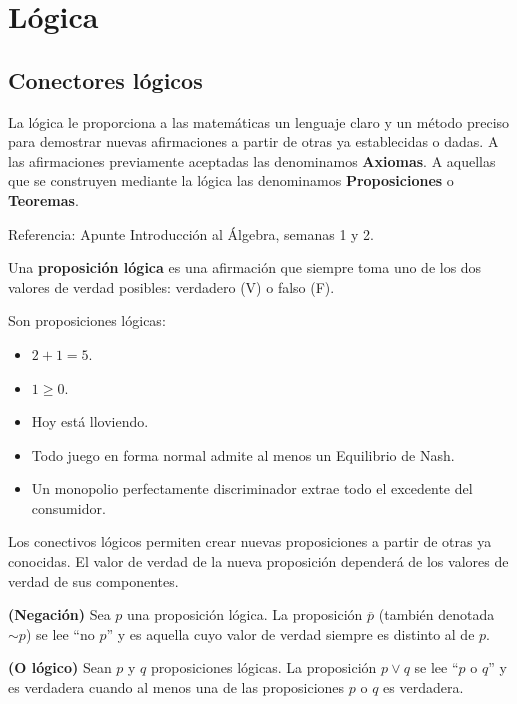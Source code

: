 
\section{Lógica}

\subsection{Conectores lógicos}

La lógica le proporciona a las matemáticas un lenguaje claro y un método preciso para demostrar nuevas afirmaciones a partir de otras ya establecidas o dadas. A las afirmaciones previamente aceptadas las denominamos \textbf{Axiomas}. A aquellas que se construyen mediante la lógica las denominamos \textbf{Proposiciones} o \textbf{Teoremas}. 

Referencia: Apunte Introducción al Álgebra, semanas 1 y 2. 

\begin{definicion}
	Una \textbf{proposición lógica} es una afirmación que siempre toma uno de los dos valores de verdad posibles: verdadero (V) o falso (F). 
\end{definicion}

\begin{ejemplo}
	Son proposiciones lógicas: 
	\begin{itemize}
		\item $2+1 = 5$. 
		\item $1 \geq 0$.
		\item Hoy está lloviendo. 
		\item Todo juego en forma normal admite al menos un Equilibrio de Nash.   
		\item Un monopolio perfectamente discriminador extrae todo el excedente del consumidor. 
	\end{itemize}
\end{ejemplo}

Los conectivos lógicos permiten crear nuevas proposiciones a partir de otras ya conocidas. El valor de verdad de la nueva proposición dependerá de los valores de verdad de sus componentes. 

\begin{definicion}
	\textbf{(Negación)} 
	Sea $p$ una proposición lógica. La proposición $\overline{p}$ (también denotada $\sim p$) se lee ``no $p$'' y es aquella cuyo valor de verdad siempre es distinto al de $p$. 
\end{definicion}

\begin{definicion}
	\textbf{(O lógico)}	
	Sean $p$ y $q$ proposiciones lógicas. La proposición $p \vee q$ se lee ``$p$ o $q$'' y es verdadera cuando al menos una de las proposiciones $p$ o $q$ es verdadera. 
\end{definicion}

